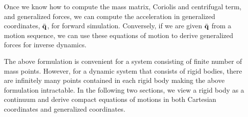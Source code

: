 Once we know how to compute the mass matrix, Coriolis and centrifugal
term, and generalized forces, we can compute the acceleration in
generalized coordinates, $\ddot{\mathbf{q}}$, for forward
simulation. Conversely, if we are given $\ddot{\mathbf{q}}$ from a motion
sequence, we can use these equations of motion to derive generalized
forces for inverse dynamics. 

The above formulation is convenient for a system consisting of finite
number of mass points. However, for a dynamic system that consists of
rigid bodies, there are infinitely many points contained in each rigid
body making the above formulation intractable. In the following two
sections, we view a rigid body as a continuum and derive compact
equations of motions in both Cartesian coordinates and generalized
coordinates.
